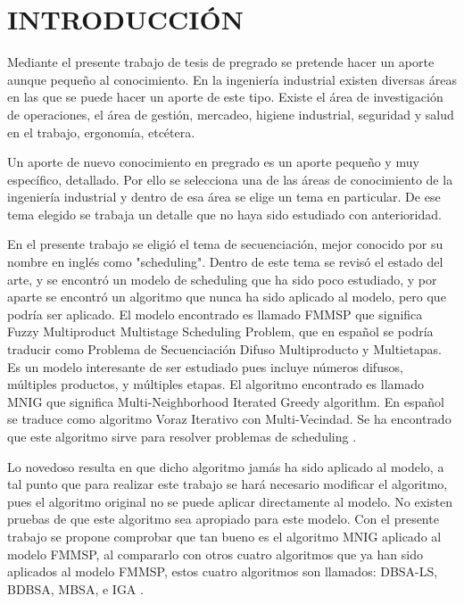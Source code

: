 \documentclass{article}
\begin{document}
\section{INTRODUCCIÓN}

Mediante el presente trabajo de tesis de pregrado se pretende hacer un aporte aunque pequeño al conocimiento. En la ingeniería industrial existen diversas áreas en las que se puede hacer un aporte de este tipo. Existe el área de investigación de operaciones, el área de gestión, mercadeo, higiene industrial, seguridad y salud en el trabajo, ergonomía, etcétera. 

\vspace{\baselineskip}
Un aporte de nuevo conocimiento en pregrado es un aporte pequeño y muy específico, detallado. Por ello se selecciona una de las áreas de conocimiento de la ingeniería industrial y dentro de esa área se elige un tema en particular. De ese tema elegido se trabaja un detalle que no haya sido estudiado con anterioridad. 

\pagebreak

\vspace{\baselineskip}
En el presente trabajo se eligió el tema de secuenciación, mejor conocido por su nombre en inglés como "scheduling". Dentro de este tema se revisó el estado del arte, y se encontró un modelo de scheduling que ha sido poco estudiado, y por aparte se encontró un algoritmo que nunca ha sido aplicado al modelo, pero que podría ser aplicado. El modelo encontrado \autocite{modFMMSP} es llamado FMMSP que significa Fuzzy Multiproduct Multistage Scheduling Problem, que en español se podría traducir como Problema de Secuenciación Difuso Multiproducto y Multietapas. Es un modelo interesante de ser estudiado pues incluye números difusos, múltiples productos, y múltiples etapas. El algoritmo encontrado \autocite{algMNIG} es llamado MNIG que significa Multi-Neighborhood Iterated Greedy algorithm. En español se traduce como algoritmo Voraz Iterativo con Multi-Vecindad. Se ha encontrado que este algoritmo sirve para resolver problemas de scheduling \autocite{algMNIG}. 

\vspace{\baselineskip}
Lo novedoso resulta en que dicho algoritmo jamás ha sido aplicado al modelo, a tal punto que para realizar este trabajo se hará necesario modificar el algoritmo, pues el algoritmo original no se puede aplicar directamente al modelo. No existen pruebas de que este algoritmo sea apropiado para este modelo. Con el presente trabajo se propone comprobar que tan bueno es el algoritmo MNIG aplicado al modelo FMMSP, al compararlo con otros cuatro algoritmos que ya han sido aplicados al modelo FMMSP, estos cuatro algoritmos son llamados: DBSA-LS, BDBSA, MBSA, e IGA \autocite{modFMMSP}.
\end{document}
